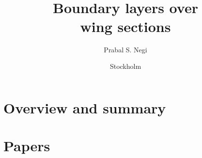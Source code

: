 \documentclass{MechThesis}
\title[Boundary layers over wing sections]%
{%
	Boundary layers over \\ wing sections
}%
\author{Prabal S. Negi}%
\affiliation
{%
	Department of Mechanics, Linn\'e FLOW Centre and Swedish e-Science Research Centre (SeRC),
	KTH Royal Institute of Technology, \\
	SE-100 44 Stockholm, Sweden
}%
\date{Stockholm}{December}{2017}%
\begin{document}
%
\frontmatter




%
\mainmatter

\part{Overview and summary}

%



%
\tocpagebreak


%
\part{Papers}

%
\makepapersummary
\cleardoublepage

%
%
%

%

\end{document}
